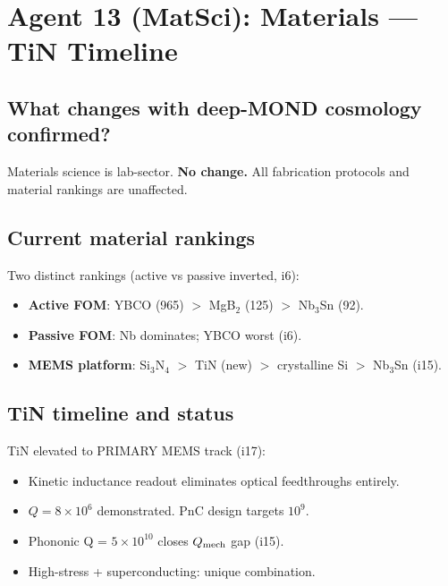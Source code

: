 \documentclass[11pt]{article}
\begin{document}
\newpage
\section{Agent 13 (MatSci): Materials --- TiN Timeline}
\label{sec:agent13}

\subsection{What changes with deep-MOND cosmology confirmed?}

Materials science is lab-sector. \textbf{No change.} All fabrication protocols
and material rankings are unaffected.

\subsection{Current material rankings}

Two distinct rankings (active vs passive inverted, i6):
\begin{itemize}
\item \textbf{Active FOM}: YBCO (965) $>$ MgB$_2$ (125) $>$ Nb$_3$Sn (92).
\item \textbf{Passive FOM}: Nb dominates; YBCO worst (i6).
\item \textbf{MEMS platform}: Si$_3$N$_4$ $>$ TiN (new) $>$ crystalline Si $>$ Nb$_3$Sn (i15).
\end{itemize}

\subsection{TiN timeline and status}

TiN elevated to PRIMARY MEMS track (i17):
\begin{itemize}
\item Kinetic inductance readout eliminates optical feedthroughs entirely.
\item $Q = 8 \times 10^6$ demonstrated. PnC design targets $10^9$.
\item Phononic Q = $5 \times 10^{10}$ closes $Q_{\rm mech}$ gap (i15).
\item High-stress + superconducting: unique combination.
\end{itemize}
\end{document}
